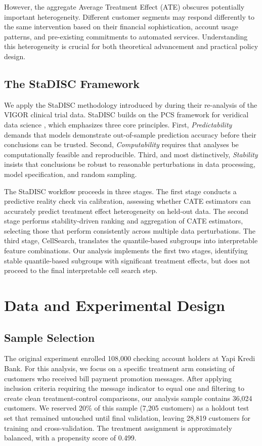 \documentclass[11pt,a4paper]{article}
\begin{document}
However, the aggregate Average Treatment Effect (ATE) obscures potentially important heterogeneity. Different customer segments may respond differently to the same intervention based on their financial sophistication, account usage patterns, and pre-existing commitments to automated services. Understanding this heterogeneity is crucial for both theoretical advancement and practical policy design.

\subsection{The StaDISC Framework}
We apply the StaDISC methodology introduced by \citet{dwivedi2020} during their re-analysis of the VIGOR clinical trial data. StaDISC builds on the PCS framework for veridical data science \citep{yu2019}, which emphasizes three core principles. First, \emph{Predictability} demands that models demonstrate out-of-sample prediction accuracy before their conclusions can be trusted. Second, \emph{Computability} requires that analyses be computationally feasible and reproducible. Third, and most distinctively, \emph{Stability} insists that conclusions be robust to reasonable perturbations in data processing, model specification, and random sampling.

The StaDISC workflow proceeds in three stages. The first stage conducts a predictive reality check via calibration, assessing whether CATE estimators can accurately predict treatment effect heterogeneity on held-out data. The second stage performs stability-driven ranking and aggregation of CATE estimators, selecting those that perform consistently across multiple data perturbations. The third stage, CellSearch, translates the quantile-based subgroups into interpretable feature combinations. Our analysis implements the first two stages, identifying stable quantile-based subgroups with significant treatment effects, but does not proceed to the final interpretable cell search step.

\section{Data and Experimental Design}

\subsection{Sample Selection}
The original experiment enrolled 108,000 checking account holders at Yapi Kredi Bank. For this analysis, we focus on a specific treatment arm consisting of customers who received bill payment promotion messages. After applying inclusion criteria requiring the message indicator to equal one and filtering to create clean treatment-control comparisons, our analysis sample contains 36,024 customers. We reserved 20\% of this sample (7,205 customers) as a holdout test set that remained untouched until final validation, leaving 28,819 customers for training and cross-validation. The treatment assignment is approximately balanced, with a propensity score of 0.499.
\end{document}

